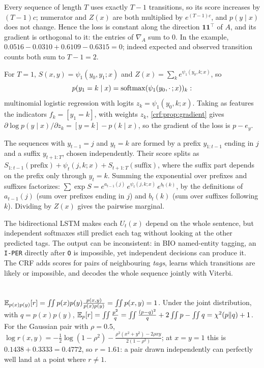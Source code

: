 Every sequence of length $T$ uses exactly $T - 1$ transitions, so its score increases by $(T - 1)c$; numerator and $Z(x)$
are both multiplied by $e^{(T-1)c}$, and $p(y\mid x)$ does not change. Hence the loss is constant along the direction
$\mathbf 1\mathbf 1^\top$ of $A$, and its gradient is orthogonal to it: the entries of $\nabla_A$ sum to $0$. In the example,
$0.0516 - 0.0310 + 0.6109 - 0.6315 = 0$; indeed expected and observed transition counts both sum
to $T - 1 = 2$.

For $T = 1$, $S(x, y) = \psi_1(y_0, y_1; x)$ and $Z(x) = \sum_ke^{\psi_1(y_0,k;x)}$, so
\[
p(y_1 = k\mid x) = \operatorname{softmax}(\psi_1(y_0,\cdot\,;x))_k :
\]
multinomial logistic regression
with logits $z_k = \psi_1(y_0, k; x)$. Taking as features the indicators $f_k = [y_1 = k]$, with weights
$z_k$, \cref{crf:prop:gradient}
gives $\partial\log p(y\mid x)/\partial z_k = [y = k] - p(k\mid x)$, so the gradient of the loss is $p - e_y$.

The sequences with $y_{t-1} = j$ and $y_t = k$ are formed by a prefix $y_{1:t-1}$ ending in $j$ and a suffix $y_{t+1:T}$, chosen
independently. Their score splits as $S_{1:t-1}(\text{prefix}) + \psi_t(j, k; x) + S_{t+1:T}(\text{suffix})$, where the suffix part depends on the
prefix only through $y_t = k$. Summing the exponential over prefixes and suffixes factorizes:
$\sum\exp S = e^{a_{t-1}(j)}\,e^{\psi_t(j,k;x)}\,e^{b_t(k)}$, by the definitions of $a_{t-1}(j)$ (sum over prefixes ending in $j$) and $b_t(k)$ (sum over suffixes
following $k$). Dividing by $Z(x)$ gives the pairwise marginal.

The bidirectional LSTM makes each $U_t(x)$ depend on the whole sentence, but independent softmaxes still
predict each tag without looking at the other predicted tags. The output can be inconsistent:
in BIO named-entity tagging, an \texttt{I-PER} directly after \texttt{O} is impossible, yet independent
decisions can produce it. The CRF adds scores for pairs of neighbouring \emph{tags}, learns which
transitions are likely or impossible, and decodes the whole sequence jointly with Viterbi.

\section{}

$\mathbb{E}_{p(x)p(y)}[r] = \iint p(x)p(y)\frac{p(x,y)}{p(x)p(y)} = \iint p(x, y) = 1$. Under the joint distribution, with $q = p(x)p(y)$,
$\mathbb{E}_{p}[r] = \iint\frac{p^2}{q} = \iint\frac{(p - q)^2}{q} + 2\iint p - \iint q = \chi^2(p\Vert q) + 1$. For the Gaussian pair with $\rho = 0.5$,
$\log r(x, y) = -\frac12\log(1 - \rho^2) - \frac{\rho^2(x^2 + y^2) - 2\rho xy}{2(1 - \rho^2)}$; at $x = y = 1$ this is $0.1438 + 0.3333 = 0.4772$, so $r = 1.61$: a pair drawn
independently can perfectly well land at a point where $r\neq1$.

